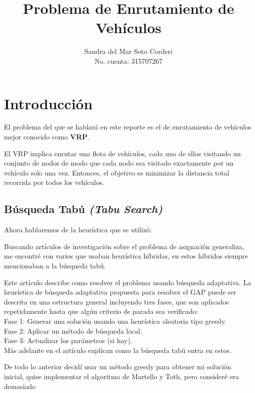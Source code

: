 \documentclass{article}
\title{Problema de Enrutamiento de Veh\'iculos}
\author{
  Sandra del Mar Soto Corderi\\
  No. cuenta: 315707267
}
\date{}
\begin{document}
\maketitle

\section{Introducción}

El problema del que se hablará en este reporte es el de enrutamiento de vehículos mejor conocido como \textbf{VRP}. 

El VRP implica enrutar una flota de vehículos, cada uno de ellos visitando un conjunto de nodos de modo que cada nodo sea visitado exactamente por un vehículo solo una vez. Entonces, el objetivo es minimizar la distancia total recorrida por todos los vehículos.


\subsection{Búsqueda Tabú \emph{(Tabu Search)}}
Ahora hablaremos de la heurística que se utilizó:

Buscando artículos de investigación sobre el problema de asignación generaliza, me encontré con varios que usaban heurística híbridas, en estos híbridos siempre mencionaban a la búsqueda tabú. 

Este artículo describe como resolver el problema usando búsqueda adaptativa. La heurística de búsqueda adaptativa propuesta para resolver el GAP puede ser descrita en una estructura general incluyendo tres fases, que son aplicados repetidamente hasta que algún criterio de parada sea verificado:\\

Fase 1: Generar una solución usando una heurística aleatoria tipo greedy.\\
Fase 2: Aplicar un método de búsqueda local.\\
Fase 3: Actualizar los parámetros (si hay).\\
Más adelante en el artículo explican como la búsqueda tabú entra en estos.

De todo lo anterior decidí usar un método greedy para obtener mi solución inicial, quise implementar el algoritmo de Martello y Toth, pero consideré era demasiado 
\end{document}
